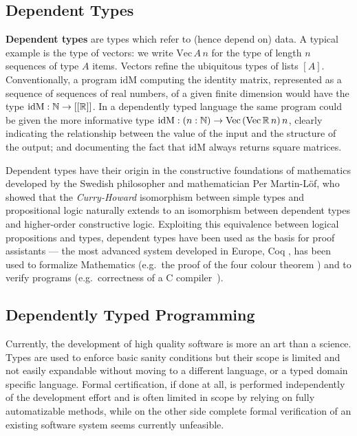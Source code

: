 \documentclass[a4paper]{article}
\begin{document}
\subsection*{Dependent Types}
\label{sec:depend-typed-progr}

\textbf{Dependent types} are types which refer to (hence depend on)
data. A typical example is the type of vectors: we write
$\mathrm{Vec}\,A\,n$ for the type of length $n$ sequences of type $A$
items. Vectors refine the ubiquitous types of lists $[A]$.
Conventionally, a program $\mathrm{idM}$ computing the identity
matrix, represented as a sequence of sequences of real numbers, of a
given finite dimension would have the type $\mathrm{idM} : \Bbb{N} \to
[[\Bbb{R}]]$. In a dependently typed language the same program could
be given the more informative type $\mathrm{idM} : (n:\Bbb{N}) \to
\mathrm{Vec}\,(\mathrm{Vec}\,\Bbb{R}\,n)\,n$, clearly indicating the
relationship between the value of the input and the structure of the
output; and documenting the fact that $\mathrm{idM}$ always returns
square matrices.

Dependent types have their origin in the constructive
foundations of mathematics \cite{martinloef:atheoryoftypes} developed
by the Swedish philosopher and mathematician Per Martin-L\"of, who
showed that the \emph{Curry-Howard} isomorphism between simple types
and propositional logic naturally extends to an isomorphism between
dependent types and higher-order constructive logic.  Exploiting this
equivalence between logical propositions and types, dependent types
have been used as the basis for proof assistants --- the most advanced
system developed in Europe, Coq \cite{coq}, has been used to formalize
Mathematics (e.g.\ the proof of the four colour theorem
\cite{gonthier:four-colour-paper}) and to verify programs (e.g.\
correctness of a C compiler~\cite{compcert,compcert-back,compcert-front}).

\subsection*{Dependently Typed Programming}

Currently, the development of high quality software is more an art
than a science. Types are used to enforce basic sanity conditions but
their scope is limited and not easily expandable without moving to a
different language, or a typed domain specific language. Formal
certification, if done at all, is performed independently of the
development effort and is often limited in scope by relying on fully
automatizable methods, while on the other side complete formal
verification of an existing software system seems currently
unfeasible. 
\end{document}
